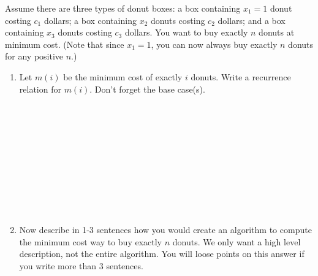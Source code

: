 \documentclass[11pt]{article}
\newcommand{\ans}[1]{}
\begin{document}
\begin{enumerate}

Assume there are three types of donut boxes: a box containing $x_{1} = 1$ donut costing $c_{1}$ dollars; a box containing $x_{2}$ donuts costing $c_{2}$ dollars; and a box containing $x_{3}$ donuts costing $c_{3}$ dollars.  You want to buy exactly $n$ donuts at minimum cost.  (Note that since $x_{1} = 1$, you can now always buy exactly $n$ donuts for any positive $n$.)

\begin{enumerate}
\item Let $m(i)$ be the minimum cost of exactly $i$ donuts.  Write a recurrence relation for $m(i)$.  Don't forget the base case(s). 
\ans{$m(0) = 0$.  For all $i<0$, $m(i) = \infty$.  For all $i>1$, $m(i) = min (m(i-1)+c_{1}, m(i-x_{2})+c_{2}, m(i-x_{3}) + c_{3})$} \ \\ \ \\ \ \\ \ \\ \ \\ \ \\ \ \\ \ \\ \ \\ \ \\ \ \\



\item Now describe in 1-3 sentences how you would create an algorithm to compute the minimum cost way to buy exactly $n$ donuts.  We only want a high level description, not the entire algorithm.  You will loose points on this answer if you write more than $3$ sentences.
\ans{Create an array $m$ of size $n$, fill it in from left to right using the above recurrence, and return the value $m[n]$.} \\ \ \\ \ \\ \ \\ \ \\ \ \\ \ \\ \ \\ \ \\ \ \\ \ \\ \ \\




\end{enumerate}
\end{enumerate}
\end{document}
